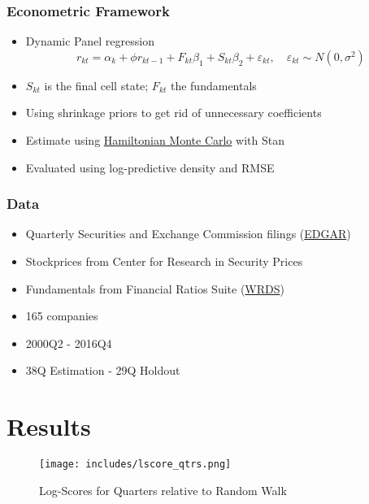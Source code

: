 \documentclass{beamer}
\begin{document}
\begin{frame}
  \frametitle{Econometric Framework}
  \begin{itemize}
  \item Dynamic Panel regression \\
    \begin{equation}
      r_{kt}= \alpha_k + \phi r_{k t-1}+  F_{kt}  \beta_1 + S_{kt}   \beta_2 + \varepsilon_{kt},\quad \varepsilon_{kt} \sim N(0, \sigma^2) \label{eq: panelreg}
  \end{equation}
  
\item $S_{kt}$ is the final cell state; $F_{kt}$ the fundamentals

\item Using shrinkage priors \citep{aki2017sparsity} to get rid of unnecessary coefficients
\item Estimate using \href{https://arogozhnikov.github.io/2016/12/19/markov_chain_monte_carlo.html}{Hamiltonian Monte Carlo} with Stan
\item Evaluated using log-predictive density and RMSE \citep{geweke2010comparing} 

  \end{itemize}
\end{frame}

\begin{frame}
  \frametitle{Data}
  \begin{itemize}
  \item Quarterly Securities and Exchange Commission filings (\href{https://www.sec.gov/edgar.shtml}{EDGAR})
  \item Stockprices from Center for Research in Security Prices
  \item Fundamentals from Financial Ratios Suite (\href{http://www.whartonwrds.com/our-datasets/}{WRDS})
  \item 165 companies
  \item 2000Q2 - 2016Q4
  \item 38Q Estimation - 29Q Holdout
  \end{itemize}
\end{frame}

\section{Results}
\frame{\sectionpage}
\begin{frame}
  
\begin{figure}
    \centering
    \texttt{[image: includes/lscore\_qtrs.png]}
    \caption{Log-Scores for Quarters relative to Random Walk}
    \label{fig:lscore_qtrs}
\end{figure}
\end{frame}
\end{document}
